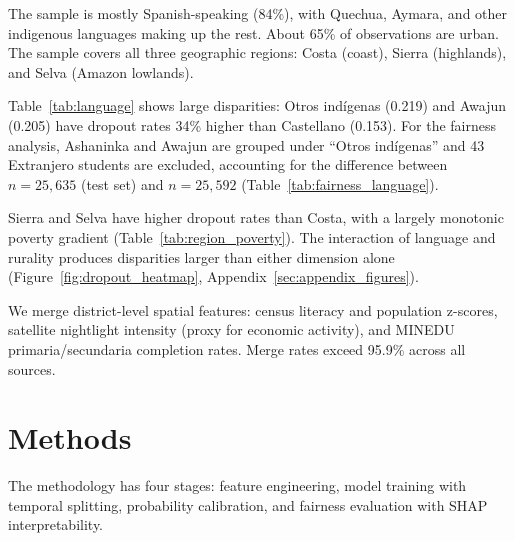 \documentclass[notitlepage,12pt]{jedm}
\begin{document}
The sample is mostly Spanish-speaking (84\%), with Quechua, Aymara, and other indigenous languages making up the rest. About 65\% of observations are urban. The sample covers all three geographic regions: Costa (coast), Sierra (highlands), and Selva (Amazon lowlands).

\begin{table}[htbp]
  \caption{Weighted Dropout Rates by Language Group.}\vspace*{1ex}
  \label{tab:language}
  
\end{table}

Table~\ref{tab:language} shows large disparities: Otros ind\'{i}genas (0.219) and Awajun (0.205) have dropout rates 34\% higher than Castellano (0.153). For the fairness analysis, Ashaninka and Awajun are grouped under ``Otros ind\'{i}genas'' and 43 Extranjero students are excluded, accounting for the difference between $n=25{,}635$ (test set) and $n=25{,}592$ (Table~\ref{tab:fairness_language}).

\begin{table}[htbp]
  \caption{Weighted Dropout Rates by Region and Poverty Quintile.}\vspace*{1ex}
  \label{tab:region_poverty}
  
\end{table}

Sierra and Selva have higher dropout rates than Costa, with a largely monotonic poverty gradient (Table~\ref{tab:region_poverty}). The interaction of language and rurality produces disparities larger than either dimension alone (Figure~\ref{fig:dropout_heatmap}, Appendix~\ref{sec:appendix_figures}).

We merge district-level spatial features: census literacy and population z-scores, satellite nightlight intensity (proxy for economic activity), and MINEDU primaria/secundaria completion rates. Merge rates exceed 95.9\% across all sources.

\section{Methods}

The methodology has four stages: feature engineering, model training with temporal splitting, probability calibration, and fairness evaluation with SHAP interpretability.
\end{document}

